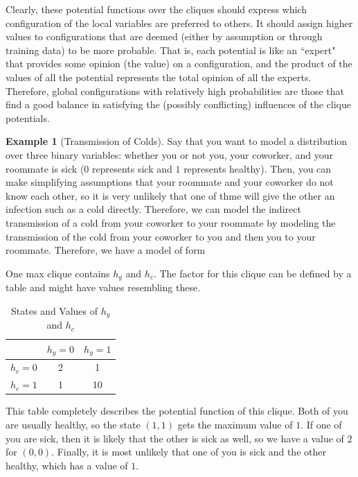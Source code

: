 \documentclass{article}
\theoremstyle{definition}
\newtheorem{example}{Example}[section]
\theoremstyle{remark}
\theoremstyle{definition}
\begin{document}
      Clearly, these potential functions over the cliques should express which configuration of the local variables are preferred to others. It should assign higher values to configurations that are deemed (either by assumption or through training data) to be more probable. That is, each potential is like an ``expert" that provides some opinion (the value) on a configuration, and the product of the values of all the potential represents the total opinion of all the experts. Therefore, global configurations with relatively high probabilities are those that find a good balance in satisfying the (possibly conflicting) influences of the clique potentials. 

      \begin{example}[Transmission of Colds] 
      Say that you want to model a distribution over three binary variables: whether you or not you, your coworker, and your roommate is sick ($0$ represents sick and $1$ represents healthy). Then, you can make simplifying assumptions that your roommate and your coworker do not know each other, so it is very unlikely that one of thme will give the other an infection such as a cold directly. Therefore, we can model the indirect transmission of a cold from your coworker to your roommate by modeling the transmission of the cold from your coworker to you and then you to your roommate. Therefore, we have a model of form

      \begin{center}
      \end{center}
      One max clique contains $h_y$ and $h_c$. The factor for this clique can be defined by a table and might have values resembling these. 
      \begin{table}[h]
      \centering
      \begin{tabular}{c|c|c|}
      \cline{2-3}
      & \( h_y = 0 \) & \( h_y = 1 \) \\ \hline
      \multicolumn{1}{|c|}{\( h_c = 0 \)} & 2 & 1 \\ \hline
      \multicolumn{1}{|c|}{\( h_c = 1 \)} & 1 & 10 \\ \hline
      \end{tabular}
      \caption{States and Values of \( h_y \) and \( h_c \)}
      \end{table}
      This table completely describes the potential function of this clique. Both of you are usually healthy, so the state $(1, 1)$ gets the maximum value of $1$. If one of you are sick, then it is likely that the other is sick as well, so we have a value of $2$ for $(0, 0)$. Finally, it is most unlikely that one of you is sick and the other healthy, which has a value of $1$. 
      \end{example}
\end{document}
